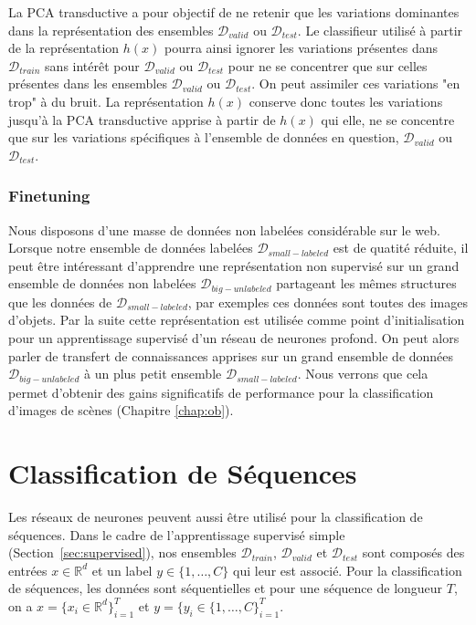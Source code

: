 La PCA transductive a pour objectif de ne retenir que les variations dominantes
dans la représentation des ensembles $\mathcal{D}_{valid}$ ou
$\mathcal{D}_{test}$. Le classifieur utilisé à partir de la représentation
$h(x)$ pourra ainsi ignorer les variations présentes dans $\mathcal{D}_{train}$
sans intérêt pour $\mathcal{D}_{valid}$ ou $\mathcal{D}_{test}$ pour ne se
concentrer que sur celles présentes dans les ensembles $\mathcal{D}_{valid}$ ou
$\mathcal{D}_{test}$. On peut assimiler ces variations "en trop" à du bruit. La
représentation $h(x)$ conserve donc toutes les variations jusqu'à la PCA
transductive apprise à partir de $h(x)$ qui elle, ne se concentre que sur les
variations spécifiques à l'ensemble de données en question,
$\mathcal{D}_{valid}$ ou $\mathcal{D}_{test}$. 

\subsubsection{Finetuning}

Nous disposons d'une masse de données non labelées considérable sur le web.
Lorsque notre ensemble de données labelées $\mathcal{D}_{small-labeled}$ est de
quatité réduite, il peut être intéressant d'apprendre une représentation non
supervisé sur un grand ensemble de données non labelées
$\mathcal{D}_{big-unlabeled}$ partageant les mêmes structures que les données
de $\mathcal{D}_{small-labeled}$, par exemples ces données sont toutes des
images d'objets. Par la suite cette représentation est utilisée comme point
d'initialisation pour un apprentissage supervisé d'un réseau de neurones
profond. On peut alors parler de transfert de connaissances apprises sur un
grand ensemble de données $\mathcal{D}_{big-unlabeled}$ à un plus petit
ensemble $\mathcal{D}_{small-labeled}$.  Nous verrons que cela permet d'obtenir
des gains significatifs de performance pour la classification d'images de
scènes (Chapitre \ref{chap:ob}).

\section{Classification de Séquences}

Les réseaux de neurones peuvent aussi être utilisé pour la classification de
séquences.  Dans le cadre de l'apprentissage supervisé simple
(Section~\ref{sec:supervised}), nos ensembles $\mathcal{D}_{train}$,
$\mathcal{D}_{valid}$ et  $\mathcal{D}_{test}$  sont composés des entrées
$x\in\mathbb{R}^{d}$ et un label $y\in\{1,\dots ,C\}$ qui leur est associé.
Pour la classification de séquences, les données sont séquentielles et pour une séquence de longueur $T$, on a $x=\lbrace x_{i}\in\mathbb{R}^{d} \rbrace_{i=1}^{T}$ et $y=\lbrace y_{i}\in\{1,\dots ,C\}_{i=1}^{T}$.

